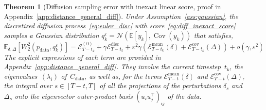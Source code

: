 \documentclass[11pt]{article}
\newtheorem{thm}{Theorem}
\newcommand{\norm}[1]{\left\|{#1}\right\|}
\newcommand{\EE}{\mathbb{E}}
\newcommand{\cov}{\operatorname{Cov}}
\begin{document}
\begin{thm}[Diffusion sampling error with inexact linear score, proof in Appendix~\ref{app:distance_general_diff}] \label{thm:distance_general_diff}
Under Assumption~\ref{ass:gaussian}, the discretized diffusion process~\eqref{eq:euler_disc} with score~\eqref{eq:diff_inexact_score} samples a Gaussian distribution ${q^\varepsilon_k = \mathcal{N}(\EE[y_{k}], \cov(y_k))}$ that satisfies, %
\begin{equation*}
\EE_{\delta, \Delta}  \left[ W_2^2(p_\mathrm{data},q_k^\varepsilon) \right] =  \mathcal{E}^{(0)}_{T-t_k} + \gamma \mathcal{E}^{\text{disc}}_{T-t_k} + \varepsilon^2 \gamma \left( \mathcal{E}_{T-t_k}^{\text{mean}}(\delta) + \mathcal{E}_{T-t_k}^{\text{cov}}(\Delta) \right) + o(\gamma, \varepsilon^2)
\end{equation*}
The explicit expressions of each term are provided in Appendix~\ref{app:distance_general_diff}. 
They involve the current timestep~$t_k$, the eigenvalues~\( (\lambda_i) \) of~\( C_{\mathrm{data}} \), as well as, for the terms $\mathcal{E}_{T-t}^{\text{mean}}(\delta)$ and $\mathcal{E}_{T-t}^{\text{cov}}(\Delta)$, the integral over $ s \in [T-t, T]$ of all the projections of the perturbations $\delta_s$ and $\Delta_s$ onto the eigenvector outer-product basis \( (u_i u_j^\top)_{ij} \) of the data.
\end{thm} 
\end{document}
